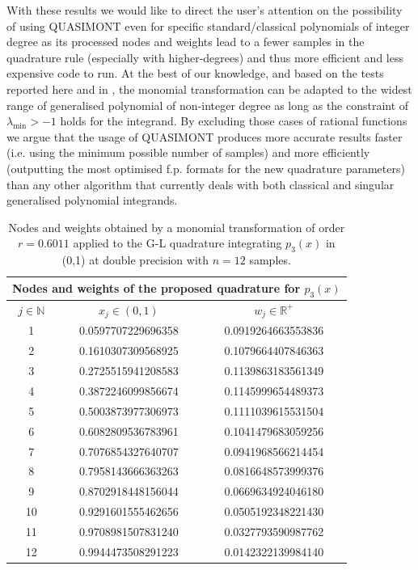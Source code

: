 \documentclass[a4paper, twosided]{book}
\begin{document}
\noindent
With these results we would like to direct the user's attention on the possibility of using QUASIMONT even for specific standard/classical polynomials of integer degree as its processed nodes and weights lead to a fewer samples in the quadrature rule (especially with higher-degrees) and thus more efficient and less expensive code to run. At the best of our knowledge, and based on the tests reported here and in \cite{Lombardi09, Lombardi21}, the monomial transformation can be adapted to the widest range of generalised polynomial of non-integer degree as long as the constraint of $\lambda_{\text{min}}>-1$ holds for the integrand. By excluding those cases of rational functions we argue that the usage of QUASIMONT produces more accurate results faster (i.e. using the minimum possible number of samples) and more efficiently (outputting the most optimised f.p. formats for the new quadrature parameters) than any other algorithm that currently deals with both classical and singular generalised polynomial integrands.

\begin{table}[H]
\centering
\begin{tabular}{|c||c|c|}
\hline
\multicolumn{3}{|c|}{\textbf{Nodes and weights of the proposed quadrature for $p_3(x)$}} \\
\hline
$j\in\mathbb{N}$ & $x_j\in(0,1)$ & $w_j\in\mathbb{R}^+$ \\
\hline
1   &  0.0597707229696358   &  0.0919264663553836  \\
2   &  0.1610307309568925   &  0.1079664407846363  \\
3   &  0.2725515941208583   &  0.1139863183561349  \\
4   &  0.3872246099856674   &  0.1145999654489373  \\
5   &  0.5003873977306973   &  0.1111039615531504  \\
6   &  0.6082809536783961   &  0.1041479683059256  \\
7   &  0.7076854327640707   &  0.0941968566214454  \\
8   &  0.7958143666363263   &  0.0816648573999376  \\
9   &  0.8702918448156044   &  0.0669634924046180  \\
10  &  0.9291601555462656   &  0.0505192348221430  \\
11  &  0.9708981507831240   &  0.0327793590987762  \\
12  &  0.9944473508291223   &  0.0142322139984140  \\
\hline
\end{tabular}
  \caption{Nodes and weights obtained by a monomial transformation of order $r=0.6011$ applied to the G-L quadrature integrating $p_3(x)$ in (0,1) at double precision with $n=12$ samples.}
  \label{table2.4}
\end{table}
\end{document}
